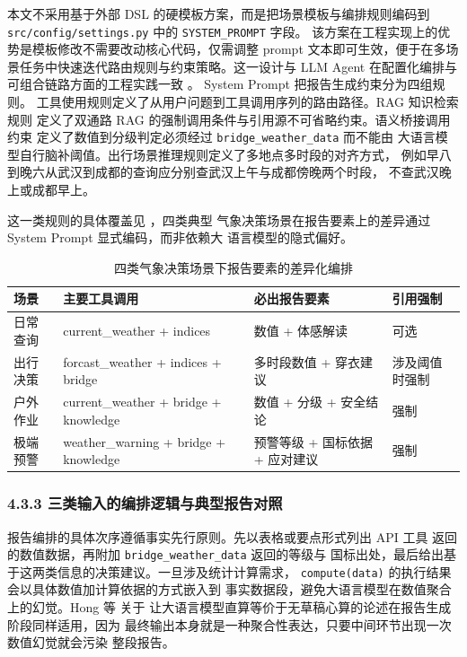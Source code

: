 本文不采用基于外部 DSL 的硬模板方案，而是把场景模板与编排规则编码到
\texttt{src/\bk{}config/\bk{}settings.\bk{}py} 中的 \texttt{SYSTEM\_\bk{}PROMPT} 字段。
该方案在工程实现上的优势是模板修改不需要改动核心代码，仅需调整 prompt
文本即可生效，便于在多场景任务中快速迭代路由规则与约束策略。这一设计与
LLM Agent 在配置化编排与可组合链路方面的工程实践一致 \cite{ref10,ref15,ref18}。
System Prompt 把报告生成约束分为四组规则。
工具使用规则定义了从用户问题到工具调用序列的路由路径。RAG 知识检索规则
定义了双通路 RAG 的强制调用条件与引用源不可省略约束。语义桥接调用约束
定义了数值到分级判定必须经过 \texttt{bridge\_\bk{}weather\_\bk{}data} 而不能由
大语言模型自行脑补阈值。出行场景推理规则定义了多地点多时段的对齐方式，
例如早八到晚六从武汉到成都的查询应分别查武汉上午与成都傍晚两个时段，
不查武汉晚上或成都早上。

这一类规则的具体覆盖见 ，四类典型
气象决策场景在报告要素上的差异通过 System Prompt 显式编码，而非依赖大
语言模型的隐式偏好。

\begin{table}[!ht]
    \centering
    \caption{四类气象决策场景下报告要素的差异化编排}
    \label{tab:report-template-routing}
    \song\fontsize{9pt}{12pt}\selectfont
    \renewcommand{\arraystretch}{0.95}
    \begin{tabular}{llll}
        \toprule
        场景 & 主要工具调用 & 必出报告要素 & 引用强制 \\
        \midrule
        日常查询 & current\_weather + indices & 数值 + 体感解读 & 可选 \\
        出行决策 & forcast\_weather + indices + bridge & 多时段数值 + 穿衣建议 & 涉及阈值时强制 \\
        户外作业 & current\_weather + bridge + knowledge & 数值 + 分级 + 安全结论 & 强制 \\
        极端预警 & weather\_warning + bridge + knowledge & 预警等级 + 国标依据 + 应对建议 & 强制 \\
        \bottomrule
    \end{tabular}
\end{table}

\subsubsection*{4.3.3 \quad 三类输入的编排逻辑与典型报告对照}

报告编排的具体次序遵循事实先行原则。先以表格或要点形式列出 API 工具
返回的数值数据，再附加 \texttt{bridge\_\bk{}weather\_\bk{}data} 返回的等级与
国标出处，最后给出基于这两类信息的决策建议。一旦涉及统计计算需求，
\texttt{compute(data)} 的执行结果会以具体数值加计算依据的方式嵌入到
事实数据段，避免大语言模型在数值聚合上的幻觉。Hong 等 \cite{ref20} 关于
让大语言模型直算等价于无草稿心算的论述在报告生成阶段同样适用，因为
最终输出本身就是一种聚合性表达，只要中间环节出现一次数值幻觉就会污染
整段报告。

